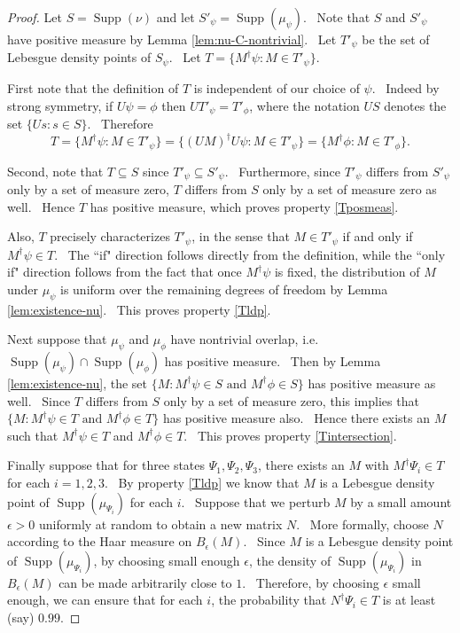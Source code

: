 \documentclass[letterpaper,11pt]{article}
\DeclareMathOperator{\supp}{Supp}
\begin{document}
\begin{proof}

Let $S=\supp(\nu)$ and let $S'_\psi = \supp(\mu_\psi)$. \ Note that $S$ and $S'_\psi$ have positive measure by Lemma \ref{lem:nu-C-nontrivial}. \ Let $T'_\psi$ be the set of Lebesgue density points of $S_\psi$. \ Let $T=\{M^\dagger \psi : M \in T'_\psi\}$.

First note that the definition of $T$ is independent of our choice of $\psi$. \ Indeed by strong symmetry, if $U\psi=\phi$ then $U T'_\psi = T'_\phi$, where the notation $U S$ denotes the set $\{Us : s\in S\}$. \ Therefore
\[
T=\{M^\dagger \psi : M \in T'_\psi\} = \{ (UM)^\dagger U \psi : M \in T'_\psi\} = \{M^\dagger \phi : M \in T'_\phi\}.
\]

Second, note that $T\subseteq S$ since $T'_\psi \subseteq S'_\psi$. \ Furthermore, since $T'_\psi$ differs from $S'_\psi$ only by a set of measure zero, $T$ differs from $S$ only by a set of measure zero as well. \ Hence $T$ has positive measure, which proves property \ref{Tposmeas}.

Also, $T$ precisely characterizes $T'_\psi$, in the sense that $M\in T'_\psi$ if and only if $M^\dagger \psi \in T$. \ The ``if" direction follows directly from the definition, while the ``only if" direction follows from the fact that once $M^\dagger \psi$ is fixed, the distribution of $M$ under $\mu_\psi$ is uniform over the remaining degrees of freedom by Lemma \ref{lem:existence-nu}. \ This proves property \ref{Tldp}.

Next suppose that $\mu_\psi$ and $\mu_\phi$ have nontrivial overlap, i.e.\ $\supp(\mu_\psi) \cap \supp(\mu_\phi)$ has positive measure. \ Then by Lemma \ref{lem:existence-nu}, the set $\{M: M^\dagger \psi \in S \text{ and } M^\dagger \phi \in S\}$ has positive measure as well. \ Since $T$ differs from $S$ only by a set of measure zero, this implies that $\{M: M^\dagger \psi \in T \text{ and } M^\dagger \phi \in T\}$ has positive measure also. \ Hence there exists an $M$ such that $M^\dagger \psi \in T$ and $M^\dagger \phi \in T$. \ This proves property \ref{Tintersection}.

Finally suppose that for three states $\Psi_1,\Psi_2,\Psi_3$, there exists an $M$ with $M^\dagger \Psi_i \in T$ for each $i=1,2,3$. \ By property \ref{Tldp} we know that $M$ is a Lebesgue density point of $\supp(\mu_{\Psi_i})$ for each $i$. \ Suppose that we perturb $M$ by a small amount $\epsilon >0$ uniformly at random to obtain a new matrix $N$. \ More formally, choose $N$ according to the Haar measure on $B_\epsilon (M)$. \ Since $M$ is a Lebesgue density point of $\supp(\mu_{\Psi_i})$, by choosing small enough $\epsilon$, the density of $\supp(\mu_{\Psi_i})$ in $B_\epsilon (M)$ can be made arbitrarily close to $1$. \ Therefore, by choosing $\epsilon$ small enough, we can ensure that for each $i$, the probability that $N^\dagger \Psi_i \in T$ is at least (say) $0.99$.


\end{proof}
\end{document}
